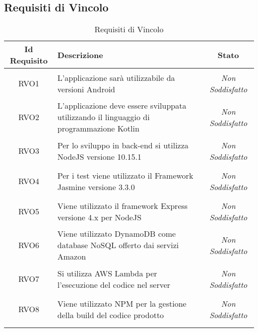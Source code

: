 \subsection{Requisiti di Vincolo}
\normalsize
\begin{longtable}{|c|>{\centering}m{7cm}|c|}
	\hline 
	\textbf{Id Requisito} & \textbf{Descrizione} & \textbf{Stato}\\
	\hline
	\endhead
	\hypertarget{RVO1}{RVO1} & L'applicazione sarà utilizzabile da versioni Android & \textit{Non Soddisfatto}\\ \hline
	
	\hypertarget{RVO2}{RVO2} & L'applicazione deve essere sviluppata utilizzando il linguaggio di programmazione Kotlin & \textit{Non Soddisfatto}\\ \hline
	
	\hypertarget{RVO3}{RVO3} & Per lo sviluppo in back-end si utilizza NodeJS versione 10.15.1 & \textit{Non Soddisfatto}\\ \hline
	
	\hypertarget{RVO4}{RVO4} & Per i test viene utilizzato il Framework Jasmine versione 3.3.0 & \textit{Non Soddisfatto}\\ \hline
	
	\hypertarget{RVO5}{RVO5} & Viene utilizzato il framework Express versione 4.x per NodeJS & \textit{Non Soddisfatto}\\ \hline
	
	\hypertarget{RVO6}{RVO6} & Viene utilizzato DynamoDB come database NoSQL offerto dai servizi Amazon & \textit{Non Soddisfatto}\\ \hline
	
	\hypertarget{RVO7}{RVO7} & Si utilizza AWS Lambda per l'esecuzione del codice nel server & \textit{Non Soddisfatto}\\ \hline
	
	\hypertarget{RVO8}{RVO8} & Viene utilizzato NPM per la gestione della build del codice prodotto & \textit{Non Soddisfatto}\\ \hline
	
	\caption[Requisiti di Vincolo]{Requisiti di Vincolo}
	\label{tabella:req3}
\end{longtable}
\clearpage

